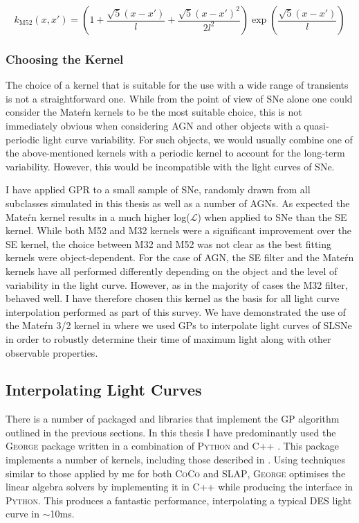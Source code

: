 \begin{equation} \label{eq:M52}
  k_{\textrm{M52}}(x,x') = \left(1 + \frac{\sqrt{5}(x - x')}{l} + \frac{\sqrt{5}(x - x')^2}{2l^2}\right) \exp \left( \frac{\sqrt{5}(x - x')}{l} \right)
\end{equation}

\subsubsection{Choosing the Kernel}
The choice of a kernel that is suitable for the use with a wide range of transients is not a straightforward one. While from the point of view of SNe alone one could consider the Mate\'rn kernels to be the most suitable choice, this is not immediately obvious when considering AGN and other objects with a quasi-periodic light curve variability. For such objects, we would usually combine one of the above-mentioned kernels with a periodic kernel to account for the long-term variability. However, this would be incompatible with the light curves of SNe.

I have applied GPR to a small sample of SNe, randomly drawn from all subclasses simulated in this thesis as well as a number of AGNs. As expected the Mate\'rn kernel results in a much higher log($\mathcal{L}$) when applied to SNe than the SE kernel. While both M52 and M32 kernels were a significant improvement over the SE kernel, the choice between M32 and M52 was not clear as the best fitting kernels were object-dependent. For the case of AGN, the SE filter and the Mate\'rn kernels have all performed differently depending on the object and the level of variability in the light curve. However, as in the majority of cases the M32 filter, behaved well. I have therefore chosen this kernel as the basis for all light curve interpolation performed as part of this survey. We have demonstrated the use of the Mate\'rn 3/2 kernel in \citet{Inserra2018} where we used GPs to interpolate light curves of SLSNe in order to robustly determine their time of maximum light along with other observable properties.

\subsection{Interpolating Light Curves}
There is a number of packaged and libraries that implement the GP algorithm outlined in the previous sections. In this thesis I have predominantly used the \textsc{George} package written in a combination of \textsc{Python} and \textsc{C++} \citep{Ambikasaran2014}. This package implements a number of kernels, including those described in . Using techniques similar to those applied by me for both \textsc{CoCo} and \textsc{SLAP}, \textsc{George} optimises the linear algebra solvers by implementing it in \textsc{C++} while producing the interface in \textsc{Python}. This produces a fantastic performance, interpolating a typical DES light curve in $\sim$10ms.

